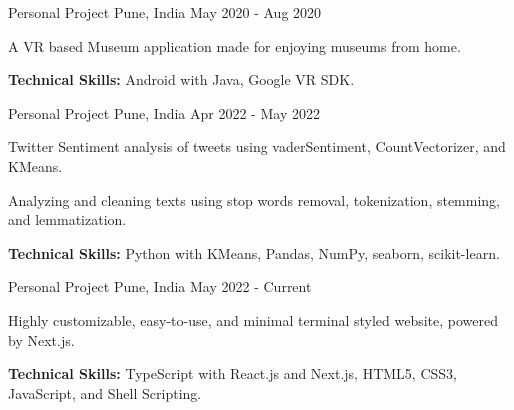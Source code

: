 \begin{cventries}
  \cventry
    {Personal Project} %
    {} %
    {Pune, India} %
    {May 2020 - Aug 2020} %
    {
      \begin{cvitems} %
        \item {A VR based Museum application made for enjoying museums from home.}
        \item {\textbf{Technical Skills:} Android with Java, Google VR SDK.}
      \end{cvitems}
    }

  \cventry
    {Personal Project} %
    {} %
    {Pune, India} %
    {Apr 2022 - May 2022} %
    {
      \begin{cvitems} %
        \item {Twitter Sentiment analysis of tweets using vaderSentiment, CountVectorizer, and KMeans.}
        \item {Analyzing and cleaning texts using stop words removal, tokenization, stemming, and lemmatization.}
        \item {\textbf{Technical Skills:} Python with KMeans, Pandas, NumPy, seaborn, scikit-learn.}
      \end{cvitems}
    }

  \cventry
    {Personal Project} %
    {} %
    {Pune, India} %
    {May 2022 - Current} %
    {
      \begin{cvitems} %
        \item {Highly customizable, easy-to-use, and minimal terminal styled website, powered by Next.js.}
        \item {\textbf{Technical Skills:} TypeScript with React.js and Next.js, HTML5, CSS3, JavaScript, and Shell Scripting.}
      \end{cvitems}
    }

\end{cventries}

